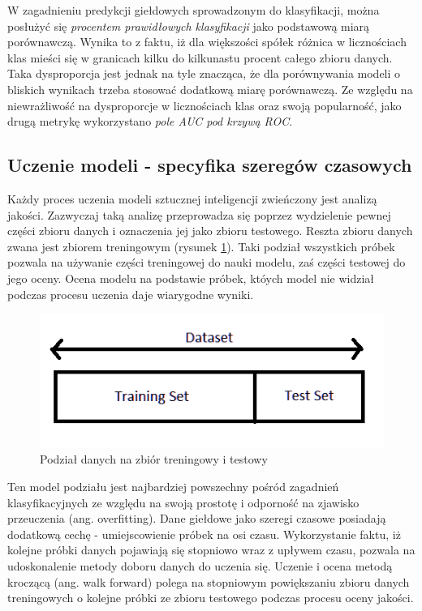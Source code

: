 \documentclass[a4paper, twoside, 11pt, openright]{article}
\begin{document}
\bigskip

W zagadnieniu predykcji giełdowych sprowadzonym do klasyfikacji, można posłużyć się \textit{procentem prawidłowych klasyfikacji} jako podstawową miarą porównawczą. Wynika to z faktu, iż dla większości spółek różnica w licznościach klas mieści się w granicach kilku do kilkunastu procent całego zbioru danych. Taka dysproporcja jest jednak na tyle znacząca, że dla porównywania modeli o bliskich wynikach trzeba stosować dodatkową miarę porównawczą. Ze względu na niewrażliwość na dysproporcje w licznościach klas oraz swoją popularność, jako drugą metrykę wykorzystano \textit{pole AUC pod krzywą ROC}.


\subsection{Uczenie modeli - specyfika szeregów czasowych}

Każdy proces uczenia modeli sztucznej inteligencji zwieńczony jest analizą jakości. Zazwyczaj taką analizę przeprowadza się poprzez wydzielenie pewnej części zbioru danych i oznaczenia jej jako zbioru testowego. Reszta zbioru danych zwana jest zbiorem treningowym (rysunek \ref{train_test_split}). Taki podział wszystkich próbek pozwala na używanie części treningowej do nauki modelu, zaś części testowej do jego oceny. Ocena modelu na podstawie próbek, któych model nie widział podczas procesu uczenia daje wiarygodne wyniki.

\begin{figure}[H]
\centering 
\includegraphics[scale=0.5]{img/train_test_split.png}
\caption{Podział danych na zbiór treningowy i testowy \cite{train_test_split}}
\label{train_test_split}
\end{figure}

Ten model podziału jest najbardziej powszechny pośród zagadnień klasyfikacyjnych ze względu na swoją prostotę i odporność na zjawisko przeuczenia (ang. overfitting). Dane giełdowe jako szeregi czasowe posiadają dodatkową cechę - umiejscowienie próbek na osi czasu. Wykorzystanie faktu, iż kolejne próbki danych pojawiają się stopniowo wraz z upływem czasu, pozwala na udoskonalenie metody doboru danych do uczenia się. Uczenie i ocena metodą kroczącą (ang. walk forward) polega na stopniowym powiększaniu zbioru danych treningowych o kolejne próbki ze zbioru testowego podczas procesu oceny jakości. 
\end{document}
